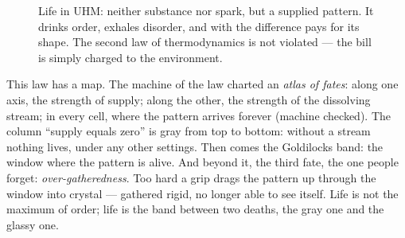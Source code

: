 \documentclass[11pt,letterpaper]{article}
\newcommand{\stT}{\textbf{[T]}\xspace}
\begin{document}
\begin{figure}[H]
\centering
{}
\caption{Life in UHM: neither substance nor spark, but a supplied
pattern. It drinks order, exhales disorder, and with the difference
pays for its shape. The second law of thermodynamics is not violated
--- the bill is simply charged to the environment.}
\label{fig:flame}
\end{figure}

This law has a map. The machine of the law charted an \emph{atlas of
fates}: along one axis, the strength of supply; along the other, the
strength of the dissolving stream; in every cell, where the pattern
arrives forever (machine checked). The column ``supply equals zero''
is gray from top to bottom: without a stream nothing lives, under
any other settings. Then comes the Goldilocks band: the window where
the pattern is alive. And beyond it, the third fate, the one people
forget: \emph{over-gatheredness}. Too hard a grip drags the pattern
up through the window into crystal --- gathered rigid, no longer
able to see itself. Life is not the maximum of order; life is the
band between two deaths, the gray one and the glassy one.
\end{document}
